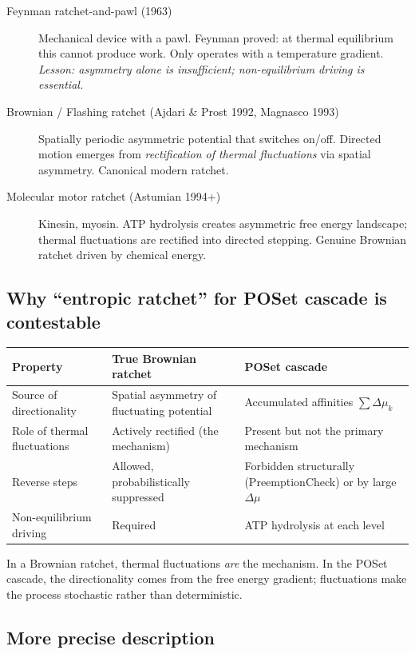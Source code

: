 \documentclass[11pt,a4paper]{article}
\begin{document}
\begin{description}
  \item[Feynman ratchet-and-pawl (1963)] Mechanical device with a pawl.
    Feynman proved: at thermal equilibrium this cannot produce work.
    Only operates with a temperature gradient. \emph{Lesson: asymmetry
    alone is insufficient; non-equilibrium driving is essential.}
  \item[Brownian / Flashing ratchet (Ajdari \& Prost 1992, Magnasco 1993)]
    Spatially periodic asymmetric potential that switches on/off.
    Directed motion emerges from \emph{rectification of thermal
    fluctuations} via spatial asymmetry.
    Canonical modern ratchet.
  \item[Molecular motor ratchet (Astumian 1994+)] Kinesin, myosin.
    ATP hydrolysis creates asymmetric free energy landscape; thermal
    fluctuations are rectified into directed stepping.
    Genuine Brownian ratchet driven by chemical energy.
\end{description}

\subsection*{Why ``entropic ratchet'' for POSet cascade is contestable}

\begin{center}
\begin{tabular}{p{4cm}p{4cm}p{4cm}}
\toprule
Property & True Brownian ratchet & POSet cascade \\
\midrule
Source of directionality & Spatial asymmetry of fluctuating potential
  & Accumulated affinities $\sum \Delta\mu_k$ \\
Role of thermal fluctuations & Actively rectified (the mechanism)
  & Present but not the primary mechanism \\
Reverse steps & Allowed, probabilistically suppressed
  & Forbidden structurally (PreemptionCheck) or by large $\Delta\mu$ \\
Non-equilibrium driving & Required & ATP hydrolysis at each level \\
\bottomrule
\end{tabular}
\end{center}

In a Brownian ratchet, thermal fluctuations \emph{are} the mechanism.
In the POSet cascade, the directionality comes from the free energy
gradient; fluctuations make the process stochastic rather than
deterministic.

\subsection*{More precise description}
\end{document}
